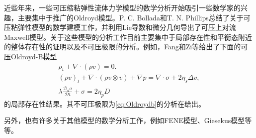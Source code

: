 近些年来，一些可压缩粘弹性流体力学模型的数学分析开始吸引一些数学家的兴趣，主要集中于推广的Oldroyd模型。P. C. Bollada和T. N. Phillips总结了关于可压粘弹性模型的数学建模工作\cite{bollada2012mathematical}，并利用Lie导数和微分几何导出了可压上对流Maxwell模型。关于这些模型的分析工作目前主要集中于局部存在性和平衡态附近的整体存在性的证明以及不可压极限的分析\cite{zhang2012global,fang2013strong,fang2014incompressible,matuvsuu1999existence,fang2013strong,barrett2016existence,salloum2011local}。例如，Fang和Zi等\cite{fang2013strong}给出了下面的可压Oldroyd-B模型
\begin{subequations}
	\begin{align*}
	\rho_t + \nabla \cdot (\rho v) = 0. \\
	(\rho v)_t + \nabla \cdot (\rho v \otimes v)  + \nabla p = \nabla \cdot \sigma + 2 \eta_s \Delta v, \\
	\lambda \frac{\mathcal{D}_a \sigma}{\mathcal{D} t} + \sigma = 2 \eta_p D
	\end{align*}
\end{subequations}
的局部存在性结果。其不可压极限为\eqref{eq:Oldroydb}的分析在\cite{fang2014incompressible}给出。

另外，也有许多关于其他模型的数学分析工作，例如FENE模型\cite{masmoudi2008well,zhang2006local,jourdain2004existence,liu2008boundary}、Giesekus模型\cite{renardy1984existence}等等。

